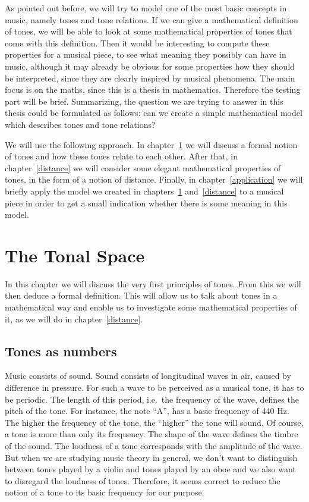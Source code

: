 \documentclass[a4paper]{book}
\theoremstyle{definition}
\begin{document}
As pointed out before, we will try to model one of the most basic concepts in music, namely tones and tone relations.
If we can give a mathematical definition of tones, we will be able to look at some mathematical properties of tones that come with this definition.
Then it would be interesting to compute these properties for a musical piece, to see what meaning they possibly can have in music, although it may already be obvious for some properties how they should be interpreted, since they are clearly inspired by musical phenomena.
The main focus is on the maths, since this is a thesis in mathematics.
Therefore the testing part will be brief.
Summarizing, the question we are trying to answer in this thesis could be formulated as follows:
can we create a simple mathematical model which describes tones and tone relations?

We will use the following approach.
In chapter~\ref{tonal_space} we will discuss a formal notion of tones and how these tones relate to each other.
After that, in chapter~\ref{distance} we will consider some elegant mathematical properties of tones, in the form of a notion of distance.
Finally, in chapter~\ref{application} we will briefly apply the model we created in chapters~\ref{tonal_space} and~\ref{distance} to a musical piece in order to get a small indication whether there is some meaning in this model.



\chapter{The Tonal Space}
\label{tonal_space}
In this chapter we will discuss the very first principles of tones.
From this we will then deduce a formal definition.
This will allow us to talk about tones in a mathematical way and enable us to investigate some mathematical properties of it, as we will do in chapter~\ref{distance}.

\section{Tones as numbers}
Music consists of sound.
Sound consists of longitudinal waves in air, caused by difference in pressure.
For such a wave to be perceived as a musical tone, it has to be periodic.
The length of this period, i.e.\ the frequency of the wave, defines the pitch of the tone.
For instance, the note ``A'', has a basic frequency of 440 Hz.
The higher the frequency of the tone, the ``higher'' the tone will sound.
Of course, a tone is more than only its frequency.
The shape of the wave defines the timbre of the sound.
The loudness of a tone corresponds with the amplitude of the wave.
But when we are studying music theory in general, we don't want to distinguish between tones played by a violin and tones played by an oboe and we also want to disregard the loudness of tones.
Therefore, it seems correct to reduce the notion of a tone to its basic frequency for our purpose.
\end{document}
